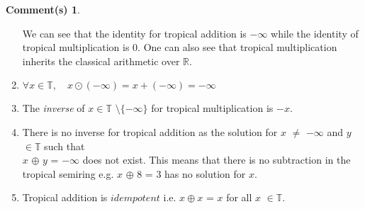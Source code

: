 \documentclass[]{article}
\theoremstyle{definition}
\numberwithin{equation}{section}
\newtheorem*{blub}{Comment(s)}
\newcommand{\R}{\mathbb{R}}
\renewcommand{\.}{\,.}
\begin{document}
\begin{blub}
\begin{enumerate}[noitemsep,topsep=-2pt]
		We can see that the identity for  tropical addition is $-\infty$ while the identity of tropical multiplication is 0. One can also see that tropical multiplication inherits the classical arithmetic over $\R$.\vspace{3mm}
		\item $\forall x \in \mathbb{T}, \quad x \odot (-\infty) = x + (-\infty) = -\infty$  \vspace{3mm}
		\item The \emph{inverse} of $x\in \mathbb{T} $ $\setminus$$\{-\infty\}$ for tropical multiplication is $-x$.  \vspace{3mm}
		\item There is no inverse for tropical addition as the solution for $x$ $\neq$ $-\infty$ and $y$ $\in \mathbb{T}$ such that\\ $x$ $\oplus$ $y$ = $-\infty$ does not exist.  This means that there is no subtraction in the tropical semiring e.g. $x$ $\oplus$ 8 = 3 has no solution for $x$.  \vspace{3mm} 
	 
		\item Tropical addition is $idempotent$ i.e. $x \oplus x$ = $x$ for all $x$ $\in  \mathbb{T}$.
	\end{enumerate}


\end{blub}
\end{document}
